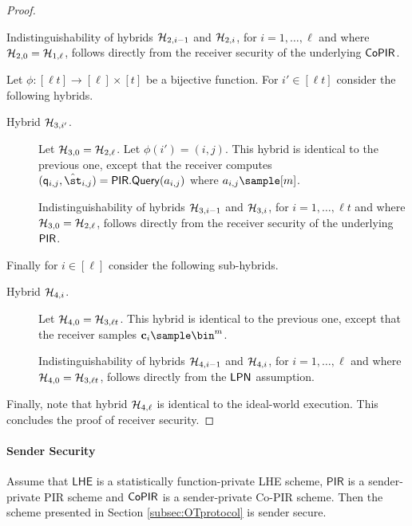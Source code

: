 \begin{proof}
\begin{description}
Indistinguishability of hybrids $\mathcal{H}_{2,i-1}$ and $\mathcal{H}_{2,i}$, for $i=1,\dots,\ell$ and where $\mathcal{H}_{2,0}=\mathcal{H}_{1,\ell}$, follows directly from the receiver security of the underlying $\mathsf{CoPIR}$.



\end{description}

Let $\phi:[\ell t] \to [\ell]\times [t]$ be a bijective function. For $i'\in[\ell t]$ consider the following hybrids.

\begin{description}
\item[Hybrid $\mathcal{H}_{3,i'}$.] Let $\mathcal{H}_{3,0}=\mathcal{H}_{2,\ell}$. Let $\phi(i')=(i,j)$. This hybrid is identical to the previous one, except that the receiver computes $(\quer_{i,j},\hat{\st}_{i,j}) = \PIR.\query(a_{i,j})$ where $a_{i,j}\sample [m]$.

Indistinguishability of hybrids $\mathcal{H}_{3,i-1}$ and $\mathcal{H}_{3,i}$, for $i=1,\dots,\ell t$ and where $\mathcal{H}_{3,0}=\mathcal{H}_{2,\ell}$, follows directly from the receiver security of the underlying $\mathsf{PIR}$.
\end{description}


Finally for $i\in [\ell]$ consider the following sub-hybrids.
\begin{description}
\item[Hybrid $\mathcal{H}_{4,i}$.] Let $\mathcal{H}_{4,0}=\mathcal{H}_{3,\ell t}$. This hybrid is identical to the previous one, except that the receiver samples $\cn_i\sample \bin^m$. 

Indistinguishability of hybrids $\mathcal{H}_{4,i-1}$ and $\mathcal{H}_{4,i}$, for $i=1,\dots,\ell$ and where $\mathcal{H}_{4,0}=\mathcal{H}_{3,\ell t}$, follows directly from the $\mathsf{LPN}$ assumption.
\end{description}

Finally, note that hybrid $\mathcal{H}_{4,\ell}$ is identical to the ideal-world execution. This concludes the proof of receiver security.
\end{proof}

\paragraph{Sender Security}

\begin{theorem}
\label{theor:SenderSecOT}
Assume that $\mathsf{LHE}$ is a statistically function-private LHE scheme, $\mathsf{PIR}$ is a sender-private PIR scheme and $\mathsf{CoPIR}$ is a sender-private Co-PIR scheme. Then the scheme presented in Section \ref{subsec:OTprotocol} is sender secure.
\end{theorem}



